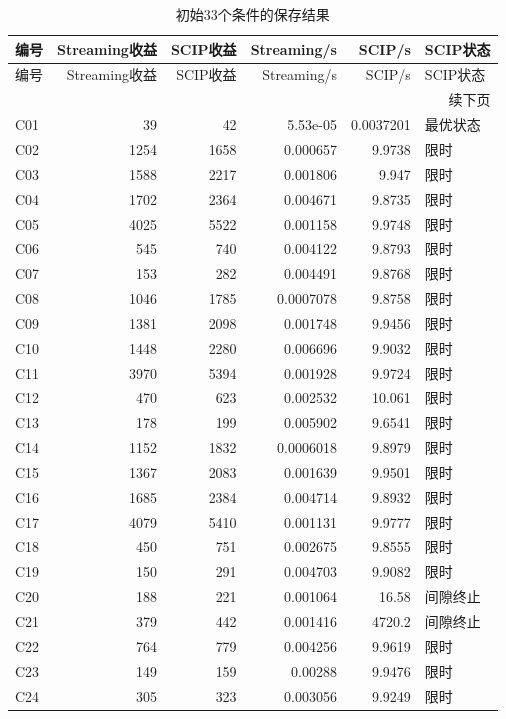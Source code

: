 {\small\setlength{\tabcolsep}{4pt}
\begin{longtable}{lrrrrl}
\caption{初始33个条件的保存结果}\label{tab:initial_results}\\
\toprule
编号 & Streaming收益 & SCIP收益 & Streaming/s & SCIP/s & SCIP状态\\
\midrule
\endfirsthead
\toprule
编号 & Streaming收益 & SCIP收益 & Streaming/s & SCIP/s & SCIP状态\\
\midrule
\endhead
\midrule
\multicolumn{6}{r}{续下页}\\
\endfoot
\bottomrule
\endlastfoot
C01 & 39 & 42 & 5.53e-05 & 0.0037201 & 最优状态\\
C02 & 1254 & 1658 & 0.000657 & 9.9738 & 限时\\
C03 & 1588 & 2217 & 0.001806 & 9.947 & 限时\\
C04 & 1702 & 2364 & 0.004671 & 9.8735 & 限时\\
C05 & 4025 & 5522 & 0.001158 & 9.9748 & 限时\\
C06 & 545 & 740 & 0.004122 & 9.8793 & 限时\\
C07 & 153 & 282 & 0.004491 & 9.8768 & 限时\\
C08 & 1046 & 1785 & 0.0007078 & 9.8758 & 限时\\
C09 & 1381 & 2098 & 0.001748 & 9.9456 & 限时\\
C10 & 1448 & 2280 & 0.006696 & 9.9032 & 限时\\
C11 & 3970 & 5394 & 0.001928 & 9.9724 & 限时\\
C12 & 470 & 623 & 0.002532 & 10.061 & 限时\\
C13 & 178 & 199 & 0.005902 & 9.6541 & 限时\\
C14 & 1152 & 1832 & 0.0006018 & 9.8979 & 限时\\
C15 & 1367 & 2083 & 0.001639 & 9.9501 & 限时\\
C16 & 1685 & 2384 & 0.004714 & 9.8932 & 限时\\
C17 & 4079 & 5410 & 0.001131 & 9.9777 & 限时\\
C18 & 450 & 751 & 0.002675 & 9.8555 & 限时\\
C19 & 150 & 291 & 0.004703 & 9.9082 & 限时\\
C20 & 188 & 221 & 0.001064 & 16.58 & 间隙终止\\
C21 & 379 & 442 & 0.001416 & 4720.2 & 间隙终止\\
C22 & 764 & 779 & 0.004256 & 9.9619 & 限时\\
C23 & 149 & 159 & 0.00288 & 9.9476 & 限时\\
C24 & 305 & 323 & 0.003056 & 9.9249 & 限时\\

\end{longtable}}
